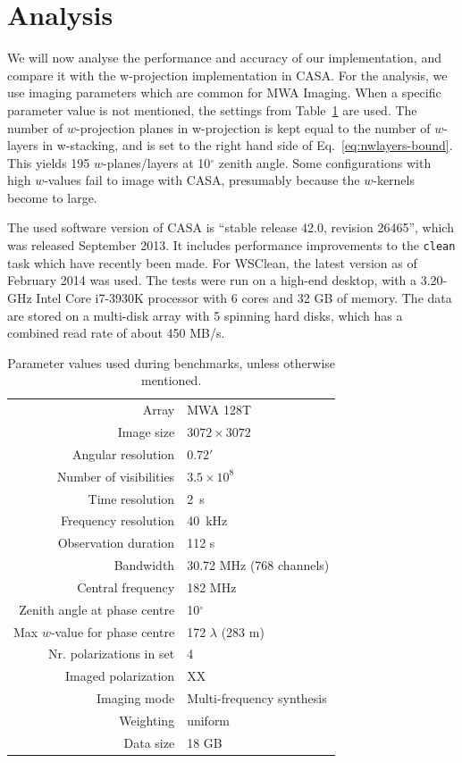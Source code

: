 \documentclass[useAMS,usenatbib]{mn2e}
\newcommand{\degree}{\ensuremath{^{\circ}}\xspace}
\begin{document}
\section{Analysis} \label{sec:analysis}
We will now analyse the performance and accuracy of our implementation, and compare it with the w-projection implementation in CASA. For the analysis, we use imaging parameters which are common for MWA Imaging. When a specific parameter value is not mentioned, the settings from Table~\ref{tbl:default-parameters} are used. The number of $w$-projection planes in w-projection is kept equal to the number of $w$-layers in w-stacking, and is set to the right hand side of Eq.~\eqref{eq:nwlayers-bound}. This yields 195 $w$-planes/layers at 10\degree zenith angle. Some configurations with high $w$-values fail to image with CASA, presumably because the $w$-kernels become to large.

The used software version of CASA is ``stable release 42.0, revision 26465'', which was released September 2013. It includes performance improvements to the \texttt{clean} task which have recently been made. For WSClean, the latest version as of February 2014 was used. The tests were run on a high-end desktop, with a 3.20-GHz Intel Core i7-3930K processor with 6 cores and 32 GB of memory. The data are stored on a multi-disk array with 5 spinning hard disks, which has a combined read rate of about 450 MB/s. 
\begin{table}%
\caption{Parameter values used during benchmarks, unless otherwise mentioned.} \label{tbl:default-parameters}%
\begin{center}\begin{tabular}{rl}%
\hline
Array & MWA 128T \\
Image size & $3072 \times 3072$ \\
Angular resolution & $0.72'$ \\
Number of visibilities & $3.5 \times 10^8$ \\
Time resolution & 2~s \\
Frequency resolution & 40~kHz \\
Observation duration & 112 s\\
Bandwidth & 30.72 MHz (768 channels)\\
Central frequency & 182 MHz \\
Zenith angle at phase centre & 10\degree \\
Max $w$-value for phase centre & 172 $\lambda$ (283 m) \\
Nr. polarizations in set & 4 \\
Imaged polarization & XX \\
Imaging mode & Multi-frequency synthesis \\
Weighting & uniform \\
Data size & 18 GB \\
\hline
\end{tabular}\end{center}\end{table}
\end{document}
